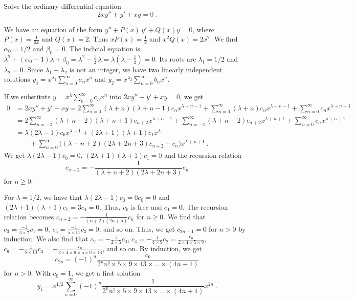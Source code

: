 \begin{egg}
Solve the ordinary differential equation
\[
2xy''+  y' + x y = 0 \ .
\]

We have an equation of the form
$\displaystyle y'' + P(x)\, y' + Q(x) y = 0$, where
$\displaystyle P(x) = \frac{1}{2x}$ and
$\displaystyle Q(x) = 2$.
Thus $\displaystyle x P(x) = \frac{1}{2}$ and
$\displaystyle x^2 Q(x) = 2x^2$.  We find
$\alpha_0 = 1/2$ and $\beta_0= 0$.  The indicial equation is
$\displaystyle \lambda^2 + (\alpha_0 - 1)\lambda + \beta_0 = \lambda^2
-\frac{1}{2}\,\lambda  = \lambda \left(\lambda -\frac{1}{2}\right) = 0$.
Its roots are $\displaystyle \lambda_1 = 1/2$ and $\lambda_2=0$.
Since $\lambda_1-\lambda_2$ is not an integer, we have two linearly
independent solutions
$\displaystyle y_1 = x^{\lambda_1} \sum_{n=0}^\infty a_n x^n$
and $\displaystyle y_2 = x^{\lambda_2} \sum_{n=0}^\infty b_n x^n$.

If we substitute $\displaystyle y = x^\lambda \sum_{n=0}^\infty c_n x^n$ into
$\displaystyle 2xy''+  y' + xy = 0$, we get
\begin{align*}
0 & = 2xy''+ y' + xy
= 2 \sum_{n=0}^\infty (\lambda+n)(\lambda+n-1) c_n x^{\lambda+n-1}
+ \sum_{n=0}^\infty (\lambda + n )c_n x^{\lambda+n-1}
+ \sum_{n=0}^\infty c_n x^{\lambda+n+1} \\
&= 2 \sum_{n=-2}^\infty (\lambda+n+2)(\lambda+n+1) c_{n+2} x^{\lambda+n+1}
+ \sum_{n=-2}^\infty (\lambda + n+2 )c_{n+2} x^{\lambda+n+1}
+ \sum_{n=0}^\infty c_n x^{\lambda+n+1} \\
&= \lambda(2\lambda-1)c_0 x^{\lambda-1}
+ (2\lambda+1)(\lambda+1) c_1 x^{\lambda} \\
&\qquad + \sum_{n=0}^\infty \big( (\lambda+n+2)(2\lambda+2n+3) c_{n+2}
+c_n\big) x^{\lambda+n+1} \ .
\end{align*}
We get $\lambda(2\lambda -1)c_0 = 0$, $(2\lambda+1)(\lambda+1) c_1 = 0$
and the recursion relation
\[
  c_{n+2} = -\frac{1}{(\lambda+n+2)(2\lambda+2n+3)} c_n
\]
for $n \geq 0$.

For $\lambda = 1/2$, we have that
$\lambda( 2\lambda -1)c_0 = 0 c_0 = 0$ and
$(2\lambda+1)(\lambda+1) c_1 = 3 c_1 = 0$.
Thus, $c_0$ is free and $c_1=0$. The recursion relation becomes
$\displaystyle c_{n+2} = -\frac{1}{(n+2)(2n+5)} c_n$
for $n \geq 0$.  We find that
$\displaystyle c_3 = \frac{-1}{3\times 7} c_1 = 0$,
$\displaystyle c_5 = \frac{-1}{5\times 11} c_3 = 0$, and so on.
Thus, we get $c_{2n-1} = 0$ for $n>0$ by induction.
We also find that 
$\displaystyle c_2 = -\frac{1}{2\times 5}c_0$,
$\displaystyle c_4 = - \frac{1}{4\times 9}c_2
= \frac{c_0}{2\times 4 \times 5 \times 9}$,
$\displaystyle c_6 = - \frac{1}{6\times 13}c_4
= -\frac{c_0}{2\times 4\times 6\times 5 \times 9 \times 13}$, and so
on.  By induction, we get
\[
c_{2n} = (-1)^n \frac{c_0}{2^n n! \times 5 \times 9 \times 13 \times \ldots
\times (4n+1)}
\]
for $n >0$.  With $c_0=1$, we get a first solution
\[
y_1 = x^{1/2} 
\sum_{n=0}^\infty 
(-1)^n \frac{1}{2^n n! \times 5 \times 9 \times 13 \times \ldots
  \times (4n+1)}x^{2n} \ .
\]


\end{egg}

